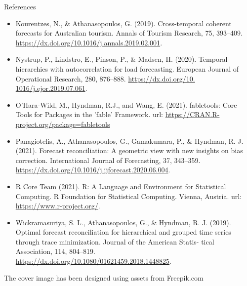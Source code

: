 \documentclass[aspectratio=169, table,colorlinks]{beamer}
\begin{document}
\begin{frame}{References}
\footnotesize
	\begin{itemize}[label = {}, itemindent=-10pt, leftmargin=*]
		\item Kourentzes, N., \& Athanasopoulos, G. (2019). Cross-temporal coherent forecasts for Australian tourism. Annals of Tourism Research, 75, 393–409. \url{https://dx.doi.org/10.1016/j.annals.2019.02.001}.
		\item Nystrup, P., Lindstro, E., Pinson, P., \& Madsen, H. (2020). Temporal hierarchies with autocorrelation for load forecasting. European Journal of Operational Research, 280, 876–888. \url{https://dx.doi.org/10. 1016/j.ejor.2019.07.061}.
		\item O'Hara-Wild, M., Hyndman, R.J., and Wang, E. (2021). fabletools: Core Tools for Packages in the 'fable' Framework. url: \url{https://CRAN.R-project.org/package=fabletools}
		\item Panagiotelis, A., Athanasopoulos, G., Gamakumara, P., \& Hyndman, R. J. (2021). Forecast reconciliation: A geometric view with new insights on bias correction. International Journal of Forecasting, 37, 343–359. \url{https://dx.doi.org/10.1016/j.ijforecast.2020.06.004}.
  		\item R Core Team (2021). R: A Language and Environment for Statistical Computing. R Foundation for Statistical Computing. Vienna, Austria. url: \url{https://www.r-project.org/}.
		\item Wickramasuriya, S. L., Athanasopoulos, G., \& Hyndman, R. J. (2019). Optimal forecast reconciliation for hierarchical and grouped time series through trace minimization. Journal of the American Statis- tical Association, 114, 804–819. \url{https://dx.doi.org/10.1080/01621459.2018.1448825}.
	\end{itemize}\vskip0.5cm
	\begin{flushright}\scriptsize
		The cover image has been designed using assets from Freepik.com 
	\end{flushright}
\end{frame}
\end{document}
